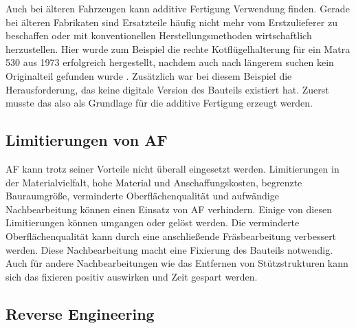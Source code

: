 \documentclass[../main.tex]{subfiles}
\begin{document}
Auch bei älteren Fahrzeugen kann additive Fertigung Verwendung finden.
Gerade bei älteren Fabrikaten sind Ersatzteile häufig nicht mehr vom 
Erstzulieferer zu beschaffen oder mit konventionellen Herstellungsmethoden
wirtschaftlich herzustellen.
Hier wurde zum Beispiel die rechte 
Kotflügelhalterung für ein Matra 530 aus 1973 erfolgreich hergestellt, nachdem auch nach längerem suchen
kein Originalteil gefunden wurde \cite{AMExpo365.03.06.2024}. Zusätzlich war
bei diesem Beispiel die Herausforderung, das keine digitale Version des
Bauteils existiert hat. Zuerst musste das also als Grundlage für die
additive Fertigung erzeugt werden.

\subsection{Limitierungen von AF}

AF kann trotz seiner Vorteile nicht überall eingesetzt werden. Limitierungen 
in der Materialvielfalt, hohe Material und Anschaffungskosten, begrenzte
Bauraumgröße, verminderte Oberflächenqualität und aufwändige Nachbearbeitung
können einen Einsatz von AF verhindern. \cite{inproceedings}
Einige von diesen Limitierungen können umgangen oder gelöst werden.
Die verminderte Oberflächenqualität kann durch eine anschließende Fräsbearbeitung
verbessert werden. 
Diese Nachbearbeitung macht eine Fixierung des Bauteils notwendig. Auch für andere
Nachbearbeitungen wie das Entfernen von Stützstrukturen kann sich das fixieren 
positiv auswirken und Zeit gespart werden.


\subsection{Reverse Engineering}
\end{document}

